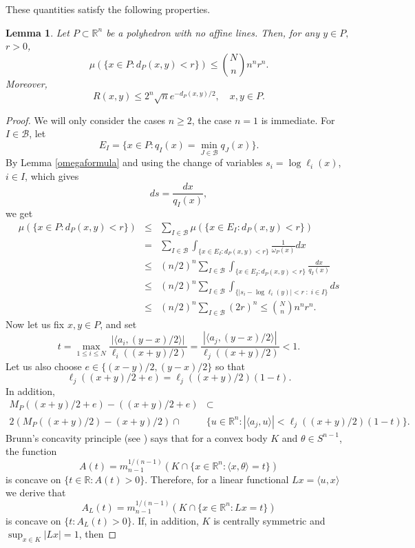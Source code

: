 \documentclass{amsart}
\theoremstyle{plain}
\newtheorem{lm}[theo]{Lemma}
\begin{document}
These quantities satisfy the following properties.
\begin{lm}\label{metricestimates}
	Let $P\subset\mathbb{R}^n$ be a polyhedron with no affine lines. Then, for any $y\in P,$ $r>0$,
	$$\mu(\{x\in P:d_{P}(x,y)<r\})\leq \binom{N}{n}n^n r^n.$$
	Moreover, 
	$$R(x,y)\leq 2^n\sqrt{n} e^{-d_P(x,y)/2}, \quad x,y\in P.$$
\end{lm}
\begin{proof}
	We will only consider the cases $n\geq 2$, the case $n=1$ is immediate.
	For $I\in\mathcal{B}$, let 
	$$E_I=\{x\in P:q_I(x)=\min_{J\in\mathcal{B}}q_J(x)\}.$$ 
	By Lemma \ref{omegaformula} and using the change of variables $s_i=\log \ell_i(x)$, $i\in I$, which gives $$ds=\frac{dx}{q_I(x)},$$ we get
	\begin{eqnarray} 
		\mu(\{x\in P:d_{P}(x,y)<r\})&\leq& \sum_{I\in\mathcal{B}} \mu(\{x\in E_I:d_{P}(x,y)<r\}) \nonumber \\
		&=& \sum_{I\in\mathcal{B}} \int_{\{x\in E_I:d_{P}(x,y)<r\}} \frac{1}{\omega_P(x)}dx \nonumber \\
		&\leq& (n/2)^n\sum_{I\in\mathcal{B}} \int_{\{x\in E_I:d_{P}(x,y)<r\}} \frac{dx}{q_I(x)} \nonumber\\
		&\leq& (n/2)^n\sum_{I\in\mathcal{B}} \int_{\{|s_i-\log \ell_i(y)|<r\; :\; i\in I\}} ds \nonumber \\
		&\leq& (n/2)^n\sum_{I\in\mathcal{B}} (2r)^n \leq\binom{N}{n}n^nr^n. \nonumber
	\end{eqnarray} 
	Now let us fix $x,y\in P$, and set $$t=\max_{1\leq i\leq N}\frac{|\langle a_i,(y-x)/2\rangle|}{\ell_i((x+y)/2)}=\frac{|\langle a_j ,(y-x)/2\rangle|}{\ell_j((x+y)/2)}<1.$$ Let us also choose $e\in \{(x-y)/2,(y-x)/2\}$ so that
	$$\ell_j((x+y)/2+e)=\ell_j((x+y)/2)(1-t).$$
	In addition, 
	\begin{align*} M_P((x+y)/2+e)-((x+y)/2+e)&\subset  \\ 2 (M_P((x+y)/2)-(x+y)/2)\cap & \{u\in\mathbb{R}^n:|\langle a_j,u\rangle|<\ell_j((x+y)/2)(1-t)\}.
	\end{align*}
	Brunn's concavity principle (see \cite[Theorem~8.4]{Gruber2007}) says that for a convex body $K$ and $\theta\in S^{n-1}$, the function $$A(t)=m_{n-1}^{1/(n-1)}(K\cap\{x\in\mathbb{R}^{n}:\langle x,\theta\rangle=t\})$$
	is concave on $\{t\in\mathbb{R}:A(t)>0\}$. Therefore, for a linear functional $Lx=\langle u,x\rangle$ we derive that
	$$A_L(t)=m_{n-1}^{1/(n-1)}(K\cap \{x\in\mathbb{R}^{n}:Lx=t\})$$
	is concave on $\{t:A_L(t)>0\}$. If, in addition, $K$ is centrally symmetric and $\sup_{x\in K}|Lx|=1$, then

\end{proof}
\end{document}
